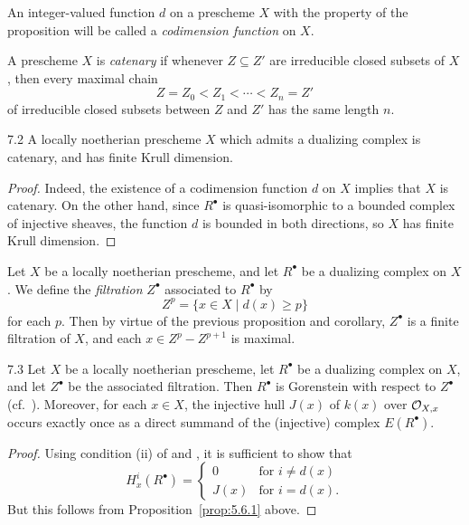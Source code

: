 \begin{definition*}
An integer-valued function $d$ on a prescheme $X$ with the property of the proposition will be called a \emph{codimension function} on $X$.
\end{definition*}

\begin{definition*}
A prescheme $X$ is \emph{catenary} if whenever $Z\subseteq Z'$ are irreducible closed subsets of $X$, then every maximal chain
\[
Z=Z_0<Z_1<\cdots<Z_n=Z'
\]
of irreducible closed subsets between $Z$ and $Z'$ has the same length $n$.
\end{definition*}

\begin{bookcorollary}{7.2}\label{cor:5.7.2}
A locally noetherian prescheme $X$ which admits a dualizing complex is catenary, and has finite Krull dimension.
\end{bookcorollary}

\begin{proof}
Indeed, the existence of a codimension function $d$ on $X$ implies that $X$ is catenary. On the other hand, since $R^\bullet$ is quasi-isomorphic to a bounded complex of injective sheaves, the function $d$ is bounded in both directions, so $X$ has finite Krull dimension.
\end{proof}

\begin{definition*}
Let $X$ be a locally noetherian prescheme, and let $R^\bullet$ be a dualizing complex on $X$. We define the \emph{filtration} $Z^\bullet$ associated to $R^\bullet$ by
\[
Z^{p} = \{x\in X\mid d(x)\geq p\}
\]
for each $p$. Then by virtue of the previous proposition and corollary, $Z^\bullet$ is a finite filtration of $X$, and each $x\in Z^{p}-Z^{p+1}$ is maximal.
\end{definition*}

\begin{bookproposition}{7.3}\label{prop:5.7.3}
Let $X$ be a locally noetherian prescheme, let $R^\bullet$ be a dualizing complex on $X$, and let $Z^\bullet$ be the associated filtration. Then $R^\bullet$ is Gorenstein with respect to $Z^\bullet$ (cf.\ ). Moreover, for each $x\in X$, the injective hull $J(x)$ of $k(x)$ over $\mathcal{O}_{X,x}$ occurs exactly once as a direct summand of the (injective) complex $E(R^\bullet)$.
\end{bookproposition}

\begin{proof}
Using condition (ii) of  and , it is sufficient to show that
\[
H_{x}^{i}(R^{\bullet}) = \begin{cases} 0 & \text{for } i\neq d(x) \\ J(x) & \text{for } i = d(x). \end{cases}
\]
But this follows from Proposition~\ref{prop:5.6.1} above.
\end{proof}

